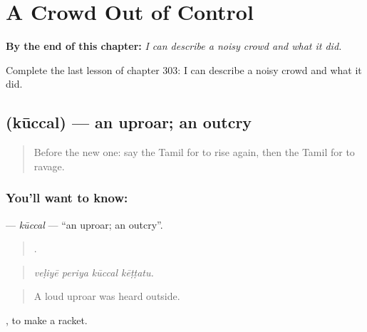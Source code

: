 
\chapter{A Crowd Out of Control}
\label{ch:ta-a-crowd-out-of-control}

\begin{chapteropening}
\textbf{By the end of this chapter:} \emph{I can describe a noisy crowd and what it did.}

Complete the last lesson of chapter 303: I can describe a noisy crowd and what it did.
\end{chapteropening}

\section[\texorpdfstring{\ta{கூச்சல்} (kūccal)}{கூச்சல் (kūccal)}]{ (kūccal) — an uproar; an outcry}

\label{lesson:TA-C303-kuccal}



\begin{quote}
Before the new one: say the Tamil for to rise again, then the Tamil for to ravage.
\end{quote}

\subsection*{You'll want to know: }
\textbf{} — \emph{kūccal} — \textquotedblleft{}an uproar; an outcry\textquotedblright{}.

\begin{quote}
   .
\end{quote}

\begin{quote}
\emph{veḷiyē periya kūccal kēṭṭatu.}
\end{quote}

\begin{quote}
A loud uproar was heard outside.
\end{quote}

 , to make a racket.

